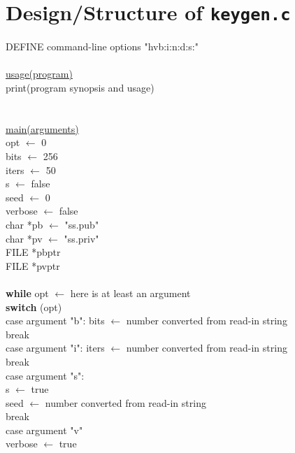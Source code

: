 \documentclass[12pt]{article}
\begin{document}
\section{Design/Structure of \texttt{keygen.c}}

DEFINE command-line options "hvb:i:n:d:s:" \\
\\
\underline{usage(program)} \\
\indent print(program synopsis and usage) \\
\\
\\
\underline{main(arguments)} \\
\indent opt $\leftarrow$ 0 \\
\indent bits $\leftarrow$ 256 \\
\indent iters $\leftarrow$ 50 \\
\indent s $\leftarrow$ false \\
\indent seed $\leftarrow$ 0 \\
\indent verbose $\leftarrow$ false \\
\indent char *pb $\leftarrow$ "ss.pub" \\
\indent char *pv $\leftarrow$ "ss.priv" \\
\indent FILE *pbptr \\
\indent FILE *pvptr \\
\\
\indent \textbf{while} opt $\leftarrow$ here is at least an argument \\
\indent \indent \textbf{switch} (opt) \\
\indent \indent \indent case argument "b": bits $\leftarrow$ number converted from read-in string \\
\indent \indent \indent \indent break \\
\indent \indent \indent case argument "i": iters $\leftarrow$ number converted from read-in string \\
\indent \indent \indent \indent break \\
\indent \indent \indent case argument "s": \\
\indent \indent \indent \indent s $\leftarrow$ true \\
\indent \indent \indent \indent seed $\leftarrow$ number converted from read-in string \\
\indent \indent \indent \indent break \\
\indent \indent \indent case argument "v" \\
\indent \indent \indent \indent verbose $\leftarrow$ true \\
\end{document}
